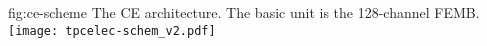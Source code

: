 
\begin{dunefigure}
{fig:ce-scheme}
{The CE architecture. The basic unit is the 128-channel FEMB.}
\texttt{[image: tpcelec-schem\_v2.pdf]}
\end{dunefigure}
